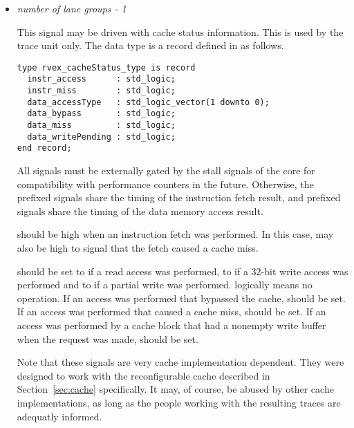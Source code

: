 \begin{itemize}
\vspace{1em}
\item {}\textit{number of lane groups - 1}

This signal may be driven with cache status information. This is used by the 
trace unit only. The data type is a record defined in  as 
follows.

\begin{lstlisting}[numbers=none]
type rvex_cacheStatus_type is record
  instr_access      : std_logic;
  instr_miss        : std_logic;
  data_accessType   : std_logic_vector(1 downto 0);
  data_bypass       : std_logic;
  data_miss         : std_logic;
  data_writePending : std_logic;
end record;
\end{lstlisting}

All signals must be externally gated by the stall signals of the core for 
compatibility with performance counters in the future. Otherwise, the 
 prefixed signals share the timing of the instruction fetch result, 
and  prefixed signals share the timing of the data memory access 
result.

 should be high when an instruction fetch was performed. In
this case,  may also be high to signal that the fetch caused a
cache miss.

 should be set to  if a read access was performed,
to  if a 32-bit write access was performed and to  if a
partial write was performed.  logically means no operation. If an
access was performed that bypassed the cache,  should be set.
If an access was performed that caused a cache miss,  should be
set. If an access was performed by a cache block that had a nonempty write
buffer when the request was made,  should be set.

Note that these signals are very cache implementation dependent. They were
designed to work with the reconfigurable cache described in
Section~\ref{sec:cache} specifically. It may, of course, be abused by other
cache implementations, as long as the people working with the resulting traces
are adequatly informed.

\end{itemize}

